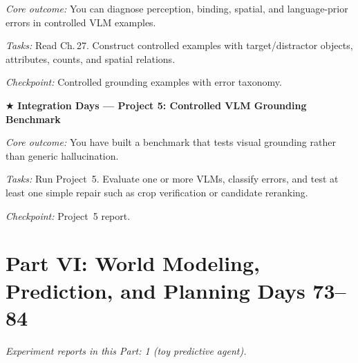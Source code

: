 \begin{description}[style=nextline, leftmargin=1.8cm, labelwidth=1.5cm]
\textit{Core outcome:} You can diagnose perception, binding, spatial, and language-prior errors in controlled VLM examples.

\textit{Tasks:} Read Ch.\,27. Construct controlled examples with target/distractor objects, attributes, counts, and spatial relations.

\textit{Checkpoint:} Controlled grounding examples with error taxonomy.

\item[Day 70--72] $\bigstar$ \textbf{Integration Days --- Project 5: Controlled VLM Grounding Benchmark}

\textit{Core outcome:} You have built a benchmark that tests visual grounding rather than generic hallucination.

\textit{Tasks:} Run Project~5. Evaluate one or more VLMs, classify errors, and test at least one simple repair such as crop verification or candidate reranking.

\textit{Checkpoint:} Project~5 report.

\end{description}

\section*{Part VI: World Modeling, Prediction, and Planning \hfill Days 73--84}

\medskip
\noindent\textit{Experiment reports in this Part: 1 (toy predictive agent).}

